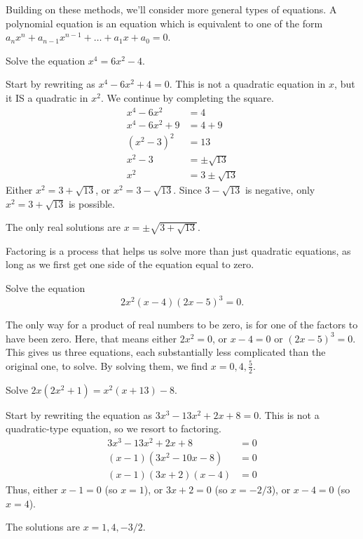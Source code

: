 \documentclass{ximera}
\begin{document}
Building on these methods, we'll consider more general types of equations.
A polynomial equation is an equation which is equivalent to one of the form $a_n x^n + a_{n-1} x^{n-1} + \dots + a_1 x + a_0 = 0$. 
\begin{example}
	Solve the equation $x^4 = 6x^2 - 4$.
	\begin{explanation}
		Start by rewriting as $x^4 - 6x^2 + 4=0$.  This is not a quadratic equation in $x$, but it IS a quadratic in $x^2$.
		We continue by completing the square.
		\begin{align*}
			x^4 - 6x^2 &= 4 \\
			x^4 - 6x^2 + 9 &= 4 + 9\\
			(x^2 - 3)^2 &= 13\\
			x^2 - 3 &= \pm \sqrt{13}\\
			x^2 &= 3 \pm \sqrt{13}
		\end{align*}
		Either $x^2 = 3 + \sqrt{13}$, or $x^2 = 3 - \sqrt{13}$.  Since $3 - \sqrt{13}$ is negative, only $x^2 = 3 + \sqrt{13}$ is possible.
		
		The only real solutions are $x = \pm \sqrt{3 + \sqrt{13}}$.
	\end{explanation}
\end{example}

Factoring is a process that helps us solve more than just quadratic equations, as long as we first get one side of the equation equal to zero.
\begin{example}
	Solve the equation
	\[ 2x^2 \left( x-4 \right) \left( 2x-5\right)^3 = 0. \]
	\begin{explanation}
		The only way for a product of real numbers to be zero, is for one of the factors to have been zero.
		Here, that means either $2x^2 = 0$, or $x-4 = 0$ or $(2x-5)^3 = 0$.
		This gives us three equations, each substantially less complicated than the original one, to solve.  By solving them, we find
		$x = 0, 4, \frac{5}{2}$.
	\end{explanation}
\end{example}

\begin{example}
	Solve  $2x(2x^2 + 1) = x^2(x +13) - 8$.
	\begin{explanation}
		Start by rewriting the equation as $3x^3-13x^2+2x+8 = 0$.  This is not a quadratic-type equation, so we resort to factoring.
		\begin{align*}
			3x^3-13x^2+2x+8 &= 0\\
			(x-1)(3x^2-10x-8) &= 0\\
			(x-1)(3x+2)(x-4) &= 0
		\end{align*}
		Thus, either $x -1 = 0$ (so $x = 1$), or $3x+2=0$ (so $x = -2/3$), or $x-4 = 0$ (so $x=4$).
		
		The solutions are $x = 1, 4, -3/2$.
	\end{explanation}
\end{example}
\end{document}
